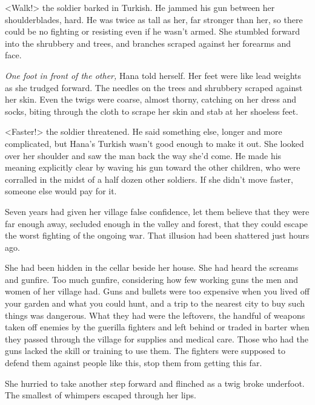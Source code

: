 





<Walk!> the soldier barked in Turkish.  He jammed his gun between her shoulderblades, hard.  He was twice as tall as her, far stronger than her, so there could be no fighting or resisting even if he wasn't armed.  She stumbled forward into the shrubbery and trees, and branches scraped against her forearms and face.



\emph{One foot in front of the other, }Hana told herself.  Her feet were like lead weights as she trudged forward.  The needles on the trees and shrubbery scraped against her skin.  Even the twigs were coarse, almost thorny, catching on her dress and socks, biting through the cloth to scrape her skin and stab at her shoeless feet.



<Faster!> the soldier threatened.  He said something else, longer and more complicated, but Hana's Turkish wasn't good enough to make it out.  She looked over her shoulder and saw the man back the way she'd come.  He made his meaning explicitly clear by waving his gun toward the other children, who were corralled in the midst of a half dozen other soldiers.  If she didn't move faster, someone else would pay for it.



Seven years had given her village false confidence, let them believe that they were far enough away, secluded enough in the valley and forest, that they could escape the worst fighting of the ongoing war.  That illusion had been shattered just hours ago.



She had been hidden in the cellar beside her house.  She had heard the screams and gunfire.  Too much gunfire, considering how few working guns the men and women of her village had.  Guns and bullets were too expensive when you lived off your garden and what you could hunt, and a trip to the nearest city to buy such things was dangerous.  What they had were the leftovers, the handful of weapons taken off enemies by the guerilla fighters and left behind or traded in barter when they passed through the village for supplies and medical care.  Those who had the guns lacked the skill or training to use them.  The fighters were supposed to defend them against people like this, stop them from getting this far.



She hurried to take another step forward and flinched as a twig broke underfoot.  The smallest of whimpers escaped through her lips.



